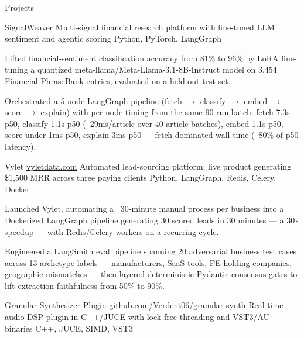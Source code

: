 \documentclass[
	11pt
]{../../../template}
\begin{document}
	\begin{rSection}{P}{rojects}
		\begin{rSectionEntry}
			{SignalWeaver}
			{}
			{Multi-signal financial research platform with fine-tuned LLM sentiment and agentic scoring}
			{Python, PyTorch, LangGraph}
			{}

			\item Lifted financial-sentiment classification accuracy from 81\% to 96\% by LoRA fine-tuning a quantized meta-llama/Meta-Llama-3.1-8B-Instruct model on 3,454 Financial PhraseBank entries, evaluated on a held-out test set.
			\item Orchestrated a 5-node LangGraph pipeline (fetch $\rightarrow$ classify $\rightarrow$ embed $\rightarrow$ score $\rightarrow$ explain) with per-node timing from the same 90-run batch: fetch 7.3s p50, classify 1.1s p50 (~29ms/article over 40-article batches), embed 1.1s p50, score under 1ms p50, explain 3ms p50 --- fetch dominated wall time (~80\% of p50 latency).
		\end{rSectionEntry}

		\begin{rSectionEntry}
			{Vylet}
			{\href{https://vyletdata.com}{vyletdata.com}}
			{Automated lead-sourcing platform; live product generating \$1,500 MRR across three paying clients}
			{Python, LangGraph, Redis, Celery, Docker}
			{}

			\item Launched Vylet, automating a ~30-minute manual process per business into a Dockerized LangGraph pipeline generating 30 scored leads in 30 minutes --- a 30x speedup --- with Redis/Celery workers on a recurring cycle.
			\item Engineered a LangSmith eval pipeline spanning 20 adversarial business test cases across 13 archetype labels --- manufacturers, SaaS tools, PE holding companies, geographic mismatches --- then layered deterministic Pydantic consensus gates to lift extraction faithfulness from 50\% to 90\%.
		\end{rSectionEntry}

		\begin{rSectionEntry}
			{Granular Synthesizer Plugin}
			{\href{https://github.com/Verdent06/granular-synth}{github.com/Verdent06/granular-synth}}
			{Real-time audio DSP plugin in C++/JUCE with lock-free threading and VST3/AU binaries}
			{C++, JUCE, SIMD, VST3}
			{}


\end{rSectionEntry}
\end{rSection}
\end{document}
